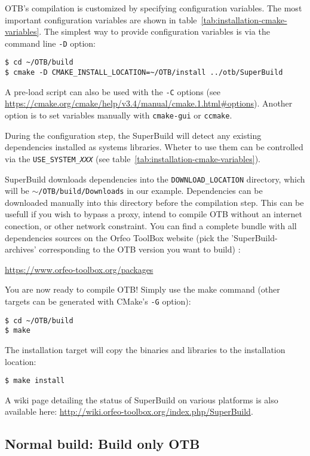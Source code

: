 OTB's compilation is customized by specifying configuration variables.
The most important configuration variables are shown in table~\ref{tab:installation-cmake-variables}.
The simplest way to provide configuration variables is via the command line \texttt{-D} option:
\begin{verbatim}
$ cd ~/OTB/build
$ cmake -D CMAKE_INSTALL_LOCATION=~/OTB/install ../otb/SuperBuild
\end{verbatim}
A pre-load script can also be used with the \texttt{-C} options (see
\url{https://cmake.org/cmake/help/v3.4/manual/cmake.1.html#options}).
Another option is to set variables manually with \texttt{cmake-gui} or \texttt{ccmake}.

During the configuration step, the SuperBuild will detect any existing dependencies installed as systems libraries.
Wheter to use them can be controlled via the \texttt{USE\_SYSTEM\_\textit{XXX}} (see
table~\ref{tab:installation-cmake-variables}).

SuperBuild downloads dependencies into the \texttt{DOWNLOAD\_LOCATION} directory, which will be
\texttt{$\sim$/OTB/build/Downloads} in our example.
Dependencies can be downloaded manually into this directory before the compilation step.
This can be usefull if you wish to bypass a proxy, intend to compile OTB without an internet conection, or other network
constraint. You can find a complete bundle with all dependencies sources on the Orfeo ToolBox website (pick the 'SuperBuild-archives' corresponding to the OTB version you want to build) :
\begin{center}
\url{https://www.orfeo-toolbox.org/packages}
\end{center}

You are now ready to compile OTB!
Simply use the make command (other targets can be generated with CMake's \texttt{-G} option):
\begin{verbatim}
$ cd ~/OTB/build
$ make
\end{verbatim}

The installation target will copy the binaries and libraries to the installation location:
\begin{verbatim}
$ make install
\end{verbatim}

A wiki page detailing the status of SuperBuild on various platforms is also available here:
\url{http://wiki.orfeo-toolbox.org/index.php/SuperBuild}.

\subsection{Normal build: Build only OTB}
\label{sec:installation-linux-normalbuild}

